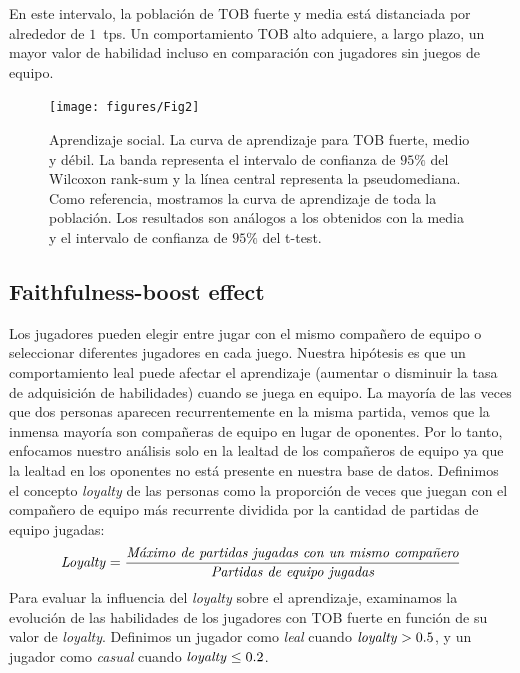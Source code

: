 \documentclass[a4paper,11pt]{book}
\theoremstyle{definition}
\begin{document}

En este intervalo, la poblaci\'on de TOB fuerte y media est\'a distanciada por alrededor de $1$~tps.
%
Un comportamiento TOB alto adquiere, a largo plazo, un mayor valor de habilidad incluso en comparaci\'on con jugadores sin juegos de equipo.


\begin{figure}[ht!]
\centering
\texttt{[image: figures/Fig2]}
\caption{
Aprendizaje social.
%
La curva de aprendizaje para TOB fuerte, medio y d\'ebil.
%
La banda representa el intervalo de confianza de $95\%$ del Wilcoxon rank-sum y la l\'inea central representa la pseudomediana.
%
Como referencia, mostramos la curva de aprendizaje de toda la poblaci\'on.
%
Los resultados son an\'alogos a los obtenidos con la media y el intervalo de confianza de $95\%$ del t-test.
}
\label{learningskill_team_hasta4team}
\end{figure}


\subsection{Faithfulness-boost effect}

Los jugadores pueden elegir entre jugar con el mismo compa\~nero de equipo o seleccionar diferentes jugadores en cada juego.
%
Nuestra hip\'otesis es que un comportamiento leal puede afectar el aprendizaje (aumentar o disminuir la tasa de adquisici\'on de habilidades) cuando se juega en equipo.
%
La mayor\'ia de las veces que dos personas aparecen recurrentemente en la misma partida, vemos que la inmensa mayor\'ia son compa\~neras de equipo en lugar de oponentes.
%
Por lo tanto, enfocamos nuestro an\'alisis solo en la lealtad de los compa\~neros de equipo ya que la lealtad en los oponentes no est\'a presente en nuestra base de datos.
%
Definimos el concepto \emph{loyalty} de las personas como la proporci\'on de veces que juegan con el compa\~nero de equipo m\'as recurrente dividida por la cantidad de partidas de equipo jugadas:
%
\begin{equation}
\text{\emph{Loyalty}} = \frac{\text{\emph{M\'aximo de partidas jugadas con un mismo compa\~nero}}}{\text{\emph{Partidas de equipo jugadas}}}
\end{equation}
%
Para evaluar la influencia del \emph{loyalty} sobre el aprendizaje, examinamos la evoluci\'on de las habilidades de los jugadores con TOB fuerte en funci\'on de su valor de \emph{loyalty}.
%
Definimos un jugador como \emph{leal} cuando $\text{\emph{loyalty}}>0.5$, y un jugador como \emph{casual} cuando $\text{\emph{loyalty}}\leq 0.2$.
\end{document}
